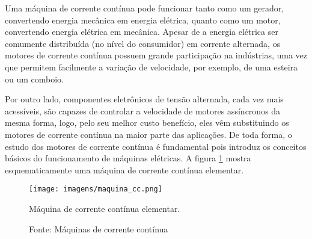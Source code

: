 
Uma máquina de corrente contínua pode funcionar tanto como um gerador, convertendo energia mecânica em energia elétrica, quanto como um motor, convertendo energia elétrica em mecânica. Apesar de a energia elétrica ser comumente distribuída (no nível do consumidor) em corrente alternada, os motores de corrente contínua possuem grande participação na indústrias, uma vez que permitem facilmente a variação de velocidade, por exemplo, de uma esteira ou um comboio. 

Por outro lado, componentes eletrônicos de tensão alternada, cada vez mais acessíveis, são capazes de controlar a velocidade de motores assíncronos da mesma forma, logo, pelo seu melhor custo benefício, eles vêm substituindo os motores de corrente contínua na maior parte das aplicações. De toda forma, o estudo dos motores de corrente contínua é fundamental pois introduz os conceitos básicos do funcionamento de máquinas elétricas. A figura \ref{fig:MCC} mostra esquematicamente uma máquina de corrente contínua elementar.

\begin{figure}[ht!]
\center
\texttt{[image: imagens/maquina\_cc.png]}
\caption{\label{fig:MCC}Máquina de corrente contínua elementar.}
\caption*{Fonte: Máquinas de corrente contínua \protect\footnotemark}
\end{figure}



